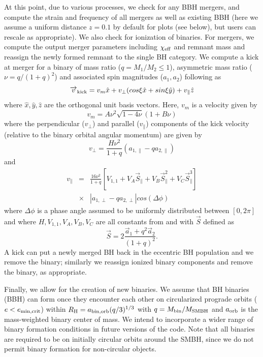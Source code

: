At this point, due to various processes, we check for any BBH mergers, and compute the strain and frequency of all mergers as well as existing BBH (here we assume a uniform distance $z=0.1$ by default for plots (see below), but users can rescale as appropriate).
We also check for ionization of binaries. For mergers, we compute the output merger parameters including $\chi_{\rm eff}$ and remnant mass \citep{TichyMarronetti08} and reassign the newly formed remnant to the single BH category.
We compute a kick at merger for a binary of mass ratio ($q=M_{1}/M_{2} \leq 1$), asymmetric mass ratio ($\nu = q/(1+q)^{2}$) and associated spin magnitudes ($a_{1},a_{2}$) following  \citep{Akiba+24} as 
\begin{equation}
{\overrightarrow{v}}_{\rm kick} = v_{m}\hat{x} + v_{\perp}(cos\xi\hat{x} + sin\xi\hat{y}) + v_{\parallel}\hat{z}
\label{eq:v_kick}
\end{equation}
where $\hat{x},\hat{y},\hat{z}$ are the orthogonal unit basis vectors.
Here, $v_{m}$ is a velocity given by
\begin{equation}
    v_{m}= A\nu^{2}\sqrt{1-4\nu}(1+B\nu)
\end{equation}
where the perpendicular ($v_{\perp}$) and parallel ($v_{\parallel}$)  components of the kick velocity (relative to the binary orbital angular momentum) are given by
\begin{equation}
    v_{\perp}=\frac{H\nu^{2}}{1+q}(a_{1,\parallel} - 
    q a_{2,\parallel})
\end{equation}
and
\begin{eqnarray}
    v_{\parallel}&=&\frac{16\nu^{2}}{1+q}[V_{1,1} + V_{A}\overrightarrow{S}_{\parallel} + V_{B}\overrightarrow{S}^{2}_{\parallel}+ V_{C}\overrightarrow{S}^{3}_{\parallel}] \nonumber\\
    &\times&|a_{1,\perp} -q a_{2,\perp}|cos(\Delta\phi)
\end{eqnarray}
where $\Delta\phi$ is a phase angle assumed to be uniformly distributed between $[0,2\pi]$ and where $H,V_{1,1},V_{A}, V_{B}, V_{C}$ are all constants from \citet{Akiba+24} and with $\overrightarrow{S}$ defined as
\begin{equation}
    {\overrightarrow{S}}=2 \frac{\overrightarrow{a}_{1}+q^{2}{\overrightarrow{a}}_{2}}{(1+q)^{2}}.
\end{equation}
A kick can put a newly merged BH back in the eccentric BH population and we remove the binary; similarly we reassign ionized binary components and remove the binary, as appropriate.

Finally, we allow for the creation of new binaries.
We assume that BH binaries (BBH) can form once they encounter each other on circularized prograde orbits ($e<e_{\rm min,crit}$) within $R_{\rm H}=a_{\rm bin,orb}(q/3)^{1/3}$ with $q=M_{\rm bin}/M_{\rm SMBH}$ and $a_{\rm orb}$ is the mass-weighted binary center of mass.
We intend to incorporate a wider range of binary formation conditions \citep{Stan+23,Rowan+23,QianLiLai24,Whitehead+24} in future versions of the code.
Note that all binaries are required to be on initially circular orbits around the SMBH, since we do not permit binary formation for non-circular objects.

